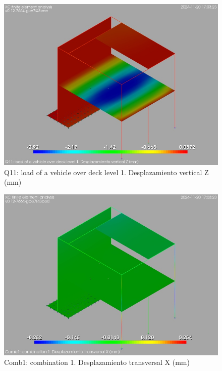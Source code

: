 \begin{figure}[ht]
\begin{center}
\includegraphics[width=\linewidth]{results/graphics/resSimplLC/QvehicleDeck1uZ.png}
\caption{Q11: load of a vehicle over deck level 1. Desplazamiento vertical Z (mm)}
\label{QvehicleDeck1uZ}
\end{center}
\end{figure}
\begin{figure}[ht]
\begin{center}
\includegraphics[width=\linewidth]{results/graphics/resSimplLC/LS1uX.png}
\caption{Comb1: combination 1. Desplazamiento transversal X (mm)}
\label{LS1uX}
\end{center}
\end{figure}
